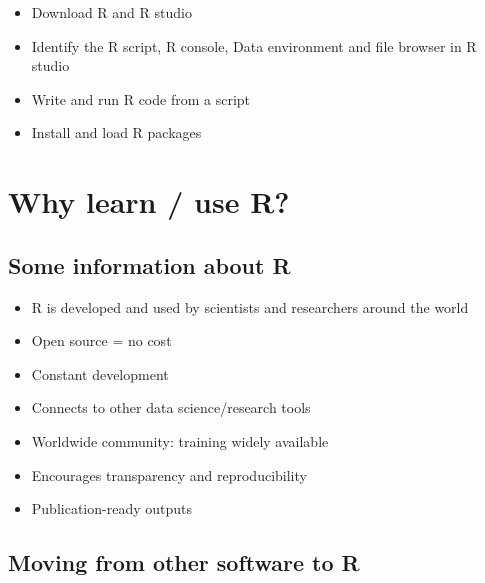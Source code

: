 \documentclass[
]{book}
\providecommand{\tightlist}{%
  \setlength{\itemsep}{0pt}\setlength{\parskip}{0pt}}
\begin{document}
\begin{itemize}
\tightlist
\item
  Download R and R studio
\item
  Identify the R script, R console, Data environment and file browser in R studio
\item
  Write and run R code from a script
\item
  Install and load R packages
\end{itemize}

\hypertarget{why-learn-use-r}{%
\section{Why learn / use R?}\label{why-learn-use-r}}

\hypertarget{some-information-about-r}{%
\subsection{Some information about R}\label{some-information-about-r}}

\begin{itemize}
\tightlist
\item
  R is developed and used by scientists and researchers around the world
\item
  Open source = no cost
\item
  Constant development
\item
  Connects to other data science/research tools
\item
  Worldwide community: training widely available
\item
  Encourages transparency and reproducibility
\item
  Publication-ready outputs
\end{itemize}

\hypertarget{moving-from-other-software-to-r}{%
\subsection{Moving from other software to R}\label{moving-from-other-software-to-r}}
\end{document}
